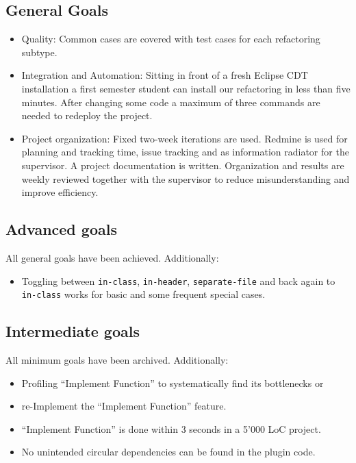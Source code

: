 \documentclass[a4paper,10pt]{scrreprt}
\begin{document}
\pagebreak

\subsection*{General Goals}

\begin{itemize}
 \item Quality: Common cases are covered with test cases for each
refactoring subtype.
 \item Integration and Automation: Sitting in front of a fresh Eclipse CDT installation a first
semester student can install our refactoring in less than five minutes. After changing some code a maximum of three commands are needed to redeploy the project.
 \item Project organization: Fixed two-week iterations are used. Redmine is used for planning and tracking time, issue tracking and as information radiator for the supervisor. A project documentation is written. Organization and results are weekly reviewed together with the supervisor to reduce misunderstanding and improve efficiency.
\end{itemize}

\subsection*{Advanced goals}

All general goals have been achieved. Additionally:
\begin{itemize}
 \item Toggling between \texttt{in-class}, \texttt{in-header},
\texttt{separate-file} and back again to \texttt{in-class} works for basic and some frequent special cases.
\end{itemize}

\subsection*{Intermediate goals}
All minimum goals have been archived. Additionally:
\begin{itemize}
 \item Profiling ``Implement Function'' to systematically find its bottlenecks or
 \item re-Implement the ``Implement Function'' feature.
 \item ``Implement Function'' is done within 3 seconds in a 5'000 LoC project.
 \item No unintended circular dependencies can be found in the plugin code.
\end{itemize}
\end{document}
